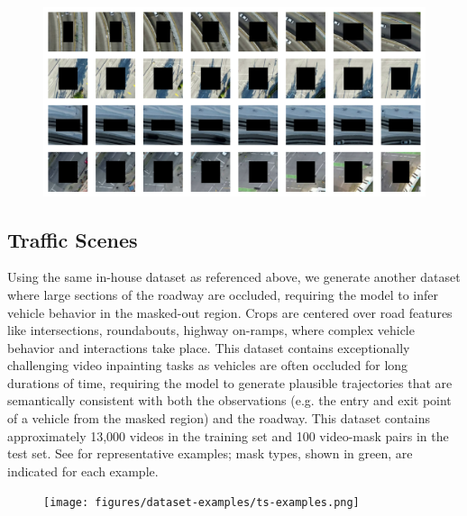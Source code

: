 \begin{figure}
    \begin{center}
        \centering
        \captionsetup{type=figure}
        \includegraphics[width=\linewidth]{figures/dataset-examples/bg-examples.pdf}
        \label{fig:bg-examples}
    \end{center}
\end{figure}
\subsection{Traffic Scenes}
Using the same in-house dataset as referenced above, we generate another dataset where large sections of the roadway are occluded, requiring the model to infer vehicle behavior in the masked-out region. Crops are centered over road features like intersections, roundabouts, highway on-ramps, \etc where complex vehicle behavior and interactions take place. This dataset contains exceptionally challenging video inpainting tasks as vehicles are often occluded for long durations of time, requiring the model to generate plausible trajectories that are semantically consistent with both the observations (e.g. the entry and exit point of a vehicle from the masked region) and the roadway. This dataset contains approximately 13,000 videos in the training set and 100 video-mask pairs in the test set. See  for representative examples; mask types, shown in green, are indicated for each example.
\begin{figure}
    \begin{center}
        \centering
        \captionsetup{type=figure}
        \texttt{[image: figures/dataset-examples/ts-examples.png]}
        \label{fig:ts-examples}
    \end{center}
    \end{figure}

